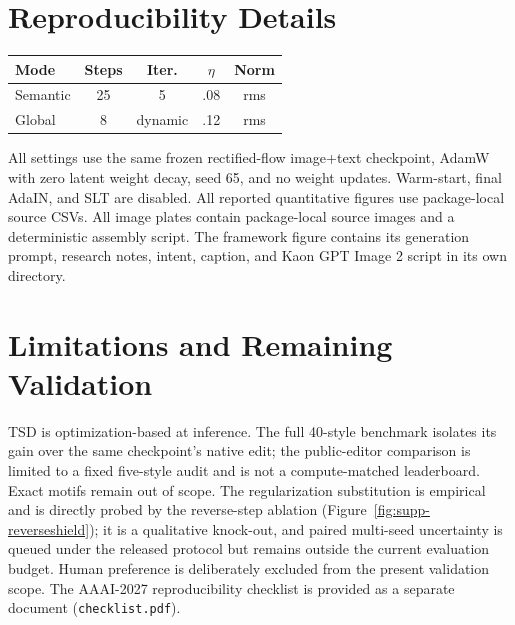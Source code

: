 \documentclass[letterpaper]{article}
\begin{document}
\section{Reproducibility Details}

\begingroup
\centering
{}
\label{tab:supp-repro}
\footnotesize
\setlength{\tabcolsep}{4pt}
\begin{tabular}{lcccc}
\toprule
Mode & Steps & Iter. & $\eta$ & Norm \\
\midrule
Semantic & 25 & 5 & .08 & rms \\
Global & 8 & dynamic & .12 & rms \\
\bottomrule
\end{tabular}
\par
\endgroup

All settings use the same frozen rectified-flow image+text checkpoint, AdamW
with zero latent weight decay, seed 65, and no weight updates. Warm-start,
final AdaIN, and SLT are disabled. All reported quantitative figures use
package-local source CSVs. All image
plates contain package-local source images and a deterministic assembly script.
The framework figure contains its generation prompt, research notes, intent,
caption, and Kaon GPT Image 2 script in its own directory.

\section{Limitations and Remaining Validation}

TSD is optimization-based at inference. The full 40-style benchmark isolates
its gain over the same checkpoint's native edit; the public-editor comparison
is limited to a fixed five-style audit and is not a compute-matched leaderboard.
Exact motifs remain out of scope. The regularization substitution is empirical
and is directly probed by the reverse-step ablation
(Figure~\ref{fig:supp-reverseshield}); it is a qualitative knock-out, and paired
multi-seed uncertainty is queued under the released protocol but remains outside
the current evaluation budget. Human preference is deliberately excluded from
the present validation scope. The AAAI-2027 reproducibility checklist is
provided as a separate document (\texttt{checklist.pdf}).
\end{document}
